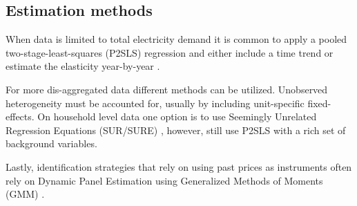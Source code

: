 \subsection{Estimation methods}
\label{subsec:b_estimation}
When data is limited to total electricity demand it is common to apply a pooled two-stage-least-squares (P2SLS) regression and either include a time trend \citep{lijesen2007real} or estimate the elasticity year-by-year \citep{bonte2015price}.
\par
For more dis-aggregated data different methods can be utilized. Unobserved heterogeneity must be accounted for, usually by including unit-specific fixed-effects. On household level data one option is to use Seemingly Unrelated Regression Equations (SUR/SURE) \citep{vesterberg2014residential}, however, \citet{alberini2019response} still use P2SLS with a rich set of background variables.
\par
Lastly, identification strategies that rely on using past prices as instruments often rely on Dynamic Panel Estimation using Generalized Methods of Moments (GMM) \citep{genc2016measuring}.